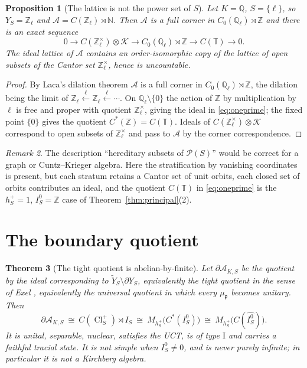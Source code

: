 \documentclass[11pt]{amsart}
\numberwithin{equation}{section}
\newtheorem{theorem}{Theorem}[section]
\newtheorem{proposition}[theorem]{Proposition}
\theoremstyle{definition}
\theoremstyle{remark}
\newtheorem{remark}[theorem]{Remark}
\newcommand{\Z}{\mathbb{Z}}
\newcommand{\Q}{\mathbb{Q}}
\newcommand{\N}{\mathbb{N}}
\newcommand{\T}{\mathbb{T}}
\newcommand{\cA}{\mathcal{A}}
\newcommand{\cK}{\mathcal{K}}
\newcommand{\pp}{\mathfrak{p}}
\newcommand{\Cl}{\operatorname{Cl}}
\begin{document}
\begin{proposition}[The lattice is not the power set of $S$]\label{prop:lattice}
Let $K=\Q$, $S=\{\ell\}$, so $Y_S=\Z_\ell$ and $\cA=C(\Z_\ell)\rtimes\N$. Then $\cA$ is a
full corner in $C_0(\Q_\ell)\rtimes\Z$ and there is an exact sequence
\begin{equation}\label{eq:oneprime}
0\longrightarrow C(\Z_\ell^\times)\otimes\cK\longrightarrow C_0(\Q_\ell)\rtimes\Z\longrightarrow C(\T)\longrightarrow0 .
\end{equation}
The ideal lattice of $\cA$ contains an order-isomorphic copy of the lattice of open subsets
of the Cantor set $\Z_\ell^\times$, hence is uncountable.
\end{proposition}

\begin{proof}
By Laca's dilation theorem $\cA$ is a full corner in $C_0(\Q_\ell)\rtimes\Z$, the dilation
being the limit of $\Z_\ell\xleftarrow{\ell}\Z_\ell\xleftarrow{\ell}\cdots$. On
$\Q_\ell\setminus\{0\}$ the action of $\Z$ by multiplication by $\ell$ is free and proper
with quotient $\Z_\ell^\times$, giving the ideal in \eqref{eq:oneprime}; the fixed point
$\{0\}$ gives the quotient $C^*(\Z)=C(\T)$. Ideals of $C(\Z_\ell^\times)\otimes\cK$
correspond to open subsets of $\Z_\ell^\times$ and pass to $\cA$ by the corner
correspondence.
\end{proof}

\begin{remark}
The description ``hereditary subsets of $\mathcal P(S)$'' would be correct for a graph or
Cuntz--Krieger algebra. Here the stratification by vanishing coordinates is present, but
each stratum retains a Cantor set of unit orbits, each closed set of orbits contributes an
ideal, and the quotient $C(\T)$ in \eqref{eq:oneprime} is the $h^+_S=1$, $I_S^0=\Z$ case of
Theorem~\ref{thm:principal}(2).
\end{remark}

\section{The boundary quotient}

\begin{theorem}[The tight quotient is abelian-by-finite]\label{thm:boundary}
Let $\partial\cA_{K,S}$ be the quotient by the ideal corresponding to
$\widetilde Y_S\setminus\partial Y_S$, equivalently the tight quotient in the sense of Exel
\cite{Exel}, equivalently the universal quotient in which every $\mu_\pp$ becomes unitary.
Then
\[
\partial\cA_{K,S}\ \cong\ C(\Cl^+_S)\rtimes I_S\ \cong\ M_{h^+_S}\bigl(C^*(I_S^0)\bigr)
\ \cong\ M_{h^+_S}\bigl(C(\widehat{I_S^0})\bigr).
\]
It is unital, separable, nuclear, satisfies the UCT, is of type $\mathrm I$ and carries a
faithful tracial state. It is not simple when $I_S^0\ne0$, and is never purely infinite; in
particular it is not a Kirchberg algebra.
\end{theorem}
\end{document}
